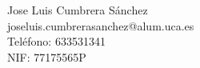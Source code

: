 Jose Luis Cumbrera Sánchez \\ %
joseluis.cumbrerasanchez@alum.uca.es \\ %
Teléfono: 633531341 \\ %
NIF: 77175565P \\ %
